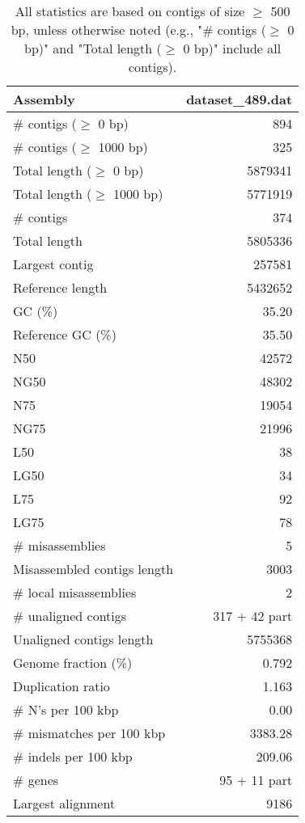 \documentclass[12pt,a4paper]{article}
\begin{document}
\begin{table}[ht]
\begin{center}
\caption{All statistics are based on contigs of size $\geq$ 500 bp, unless otherwise noted (e.g., "\# contigs ($\geq$ 0 bp)" and "Total length ($\geq$ 0 bp)" include all contigs).}
\begin{tabular}{|l*{1}{|r}|}
\hline
Assembly & dataset\_489.dat \\ \hline
\# contigs ($\geq$ 0 bp) & 894 \\ \hline
\# contigs ($\geq$ 1000 bp) & 325 \\ \hline
Total length ($\geq$ 0 bp) & 5879341 \\ \hline
Total length ($\geq$ 1000 bp) & 5771919 \\ \hline
\# contigs & 374 \\ \hline
Total length & 5805336 \\ \hline
Largest contig & 257581 \\ \hline
Reference length & 5432652 \\ \hline
GC (\%) & 35.20 \\ \hline
Reference GC (\%) & 35.50 \\ \hline
N50 & 42572 \\ \hline
NG50 & 48302 \\ \hline
N75 & 19054 \\ \hline
NG75 & 21996 \\ \hline
L50 & 38 \\ \hline
LG50 & 34 \\ \hline
L75 & 92 \\ \hline
LG75 & 78 \\ \hline
\# misassemblies & 5 \\ \hline
Misassembled contigs length & 3003 \\ \hline
\# local misassemblies & 2 \\ \hline
\# unaligned contigs & 317 + 42 part \\ \hline
Unaligned contigs length & 5755368 \\ \hline
Genome fraction (\%) & 0.792 \\ \hline
Duplication ratio & 1.163 \\ \hline
\# N's per 100 kbp & 0.00 \\ \hline
\# mismatches per 100 kbp & 3383.28 \\ \hline
\# indels per 100 kbp & 209.06 \\ \hline
\# genes & 95 + 11 part \\ \hline
Largest alignment & 9186 \\ \hline
\end{tabular}
\end{center}
\end{table}
\end{document}
